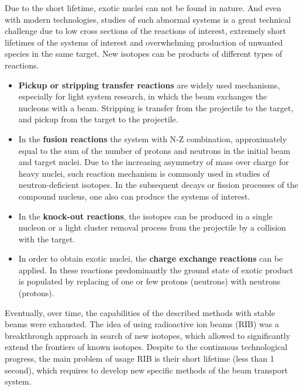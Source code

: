 Due to the short lifetime, exotic nuclei can not be found in nature.
And even with modern technologies, studies of such abnormal systems is a great technical challenge due to low cross sections of the reactions of interest, extremely short lifetimes of the systems of interest and overwhelming production of unwanted species in the same target.
New isotopes can be products of different types of reactions.
\begin{itemize}
	\item 
	\textbf{Pickup or stripping transfer reactions} are widely used mechanisms, especially for light system research, in which the beam exchanges the nucleons with a beam. 
	Stripping is transfer from the projectile to the target, and pickup from the target to the projectile.
	
	\item 
	In the \textbf{fusion reactions} the system with N-Z combination, approximately equal to the sum of the number of protons and neutrons in the initial beam and target nuclei.
	Due to the increasing asymmetry of mass over charge for heavy nuclei, such reaction mechanism is commonly used in studies of neutron-deficient isotopes.	
	In the subsequent decays or fission processes of the compound nucleus, one also can produce the systems of interest. 
	
	\item
	In the \textbf{knock-out reactions}, the isotopes can be produced in a single nucleon or a light cluster removal process from the projectile by a collision with the target.
	
	\item
	In order to obtain exotic nuclei, the \textbf{charge exchange reactions} can be applied.
	In these reactions predominantly  the ground state of exotic product is populated by replacing of one or few protons (neutrons) with neutrons (protons).
	
	
\end{itemize}	

Eventually, over time, the capabilities of the described methods with stable beams were exhausted.
The idea of using radioactive ion beams (RIB) was a breakthrough approach in search of new isotopes, which allowed to significantly extend the frontiers of known isotopes. 
Despite to the continuous technological progress, the main problem of usage RIB is their short lifetime (less than 1 second), which requires to develop new specific methods of the beam transport system.


